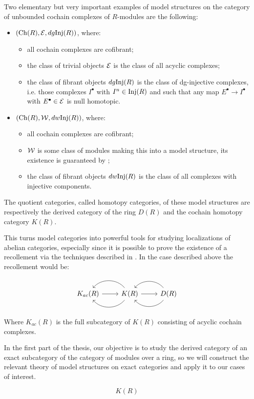 Two elementary but very important examples of model structures on the category of unbounded cochain complexes of $R$-modules are the following:
\begin{itemize}
  \item $(\mathrm{Ch}(R),\mathcal{E},dg \mathrm{Inj}(R))$, where:
    \begin{itemize}
      \item all cochain complexes are cofibrant;
      \item the class of trivial objects $\mathcal{E}$ is the class of all acyclic complexes;
      \item the class of fibrant objects $dg \mathrm{Inj}(R)$ is the class of dg-injective complexes, i.e. those complexes $I^\bullet$ with $I^n\in\mathrm{Inj}(R)$ and such that any map $E^\bullet \to I^\bullet$ with $E^\bullet\in\mathcal{E}$ is null homotopic.
    \end{itemize}
  \item $(\mathrm{Ch}(R),\mathcal{W},dw \mathrm{Inj}(R))$, where:
    \begin{itemize}
      \item all cochain complexes are cofibrant;
      \item $\mathcal{W}$ is some class of modules making this into a model structure, its existence is guaranteed by \cite{G4};
      \item the class of fibrant objects $dw \mathrm{Inj}(R)$ is the class of all complexes with injective components.
    \end{itemize}
\end{itemize}

The quotient categories, called homotopy categories, of these model structures are respectively the derived category of the ring $D(R)$ and the cochain homotopy category $K(R)$.

This turns model categories into powerful tools for studying localizations of abelian categories, especially since it is possible to prove the existence of a recollement via the techniques described in \cite{G7}. In the case described above the recollement would be:

\begin{equation*}
\recdiagram{K_{ac}(R)}{K(R)}{D(R)}
\end{equation*}

Where $K_{ac}(R)$ is the full subcategory of $K(R)$ consisting of acyclic cochain complexes.

In the first part of the thesis, our objective is to study the derived category of an exact subcategory of the category of modules over a ring, so we will construct the relevant theory of model structures on exact categories and apply it to our cases of interest.

\begin{equation}
K(R)
\end{equation}

